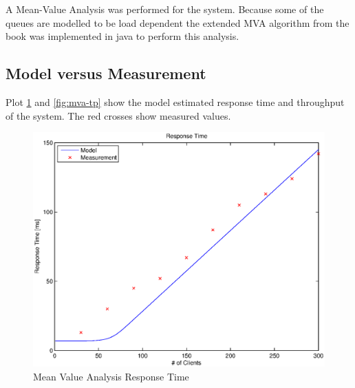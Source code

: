 \documentclass[a4paper]{article}
\begin{document}
A Mean-Value Analysis was performed for the system. Because some of the queues are modelled to be load dependent the extended MVA algorithm from the book \cite[Box 36.1]{Raj} was implemented in java to perform this analysis.

\subsection{Model versus Measurement}
Plot \ref{fig:mva-rt} and \ref{fig:mva-tp} show the model estimated response time and throughput of the system. The red crosses show measured values.



\begin{figure}[H]
	\begin{center}
    \includegraphics[scale=0.6]{../plots-ms2-mg/mva-rt.eps}
  \end{center}
  \caption{Mean Value Analysis Response Time}
  \label{fig:mva-rt}
\end{figure}


\end{document}
